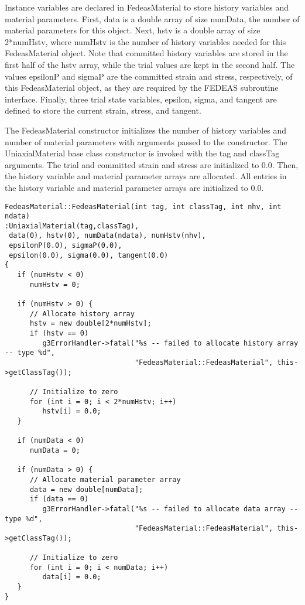 \documentclass[12pt]{article}
\begin{document}
Instance variables are declared in FedeasMaterial to store history variables and material
parameters.  First, data is a double array of size numData, the number of material
parameters for this object. Next, hstv is a double array of size 2*numHstv, where numHstv is
the number of history variables needed for this FedeasMaterial object. Note that committed
history variables are stored in the first half of the hstv array, while the trial values
are kept in the second half. The values epsilonP and sigmaP are the committed strain and
stress, respectively, of this FedeasMaterial object, as they
are required by the FEDEAS subroutine interface. Finally, three trial state variables,
epsilon, sigma, and tangent are defined to store the current strain, stress, and tangent.

The FedeasMaterial constructor initializes the number of history variables and number
of material parameters with arguments passed to the constructor. The UniaxialMaterial
base class constructor is invoked with the tag and classTag arguments. The trial and
committed strain and stress are initialized to $0.0$. Then, the
history variable and material parameter arrays are allocated. All entries in the history
variable and material parameter arrays are initialized to $0.0$.

{\sf\small
\begin{verbatim}
FedeasMaterial::FedeasMaterial(int tag, int classTag, int nhv, int ndata)
:UniaxialMaterial(tag,classTag),
 data(0), hstv(0), numData(ndata), numHstv(nhv),
 epsilonP(0.0), sigmaP(0.0),
 epsilon(0.0), sigma(0.0), tangent(0.0)
{
   if (numHstv < 0)
      numHstv = 0;
     
   if (numHstv > 0) {
      // Allocate history array
      hstv = new double[2*numHstv];
      if (hstv == 0)
         g3ErrorHandler->fatal("%s -- failed to allocate history array -- type %d",
                               "FedeasMaterial::FedeasMaterial", this->getClassTag());

      // Initialize to zero
      for (int i = 0; i < 2*numHstv; i++)
         hstv[i] = 0.0;
   }
     
   if (numData < 0)
      numData = 0;
     
   if (numData > 0) {
      // Allocate material parameter array
      data = new double[numData];
      if (data == 0)
         g3ErrorHandler->fatal("%s -- failed to allocate data array -- type %d",
                               "FedeasMaterial::FedeasMaterial", this->getClassTag());

      // Initialize to zero
      for (int i = 0; i < numData; i++)
         data[i] = 0.0;
   }
}
\end{verbatim}
}
\end{document}
